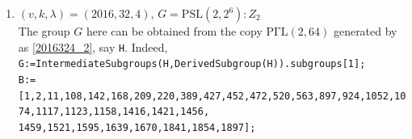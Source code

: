 \documentclass[a4paper,twopage,reqno,12pt]{amsart}
\theoremstyle{definition}
\numberwithin{equation}{section}
\newcommand{\PSL}{\mathrm{PSL}}
\newcommand{\PGaL}{\mathrm{P\Gamma L}}
\newcommand{\Aut}{\mathrm{Aut}}
\begin{document}
\begin{enumerate}
{{(283,290,315,431,304)(286,391,341,360,444)(287,416,359,336,394)(288,313,392,451,486)(289,378,342,429,485)\\
(291,417,476,338,307)(293,421,302,401,492)(294,321,410,472,491)(296,322,412,367,435)(297,397,344,371,448)\\
(298,396,478,350,442)(299,398,351,319,389)(301,355,379,361,349)(305,402,317,380,440)(311,333,408,496,474)\\
(312,430,467,326,404)(314,357,445,386,323)(318,362,447,454,488)(320,411,337,385,438)(324,413,390,325,403)\\
(328,405,343,393,452)(329,407,493,464,372)(330,406,459,470,462)(332,339,424,471,490)(335,423,455,482,387)\\
(345,432,487,374,450)(353,443,494,461,475)(354,358,377,453,366)(363,446,369,436,484)(364,383,441,457,483)\\
(388,439,473,456,463);\\}
}
\texttt{B:=[1,2,3,7,29,73,121,170,175,177,187,223,237,259,267,284,308,311,315,\\422,427,486];}\\



\item\label{2016324_1} $(v,k,\lambda)=(2016,32,4)$, $G=\PSL(2,2^6):Z_{2}$\\
    The group $G$ here can be obtained from the copy $\PGaL(2,64)$ generated by as \ref{2016324_2}, say \texttt{H}. Indeed,\\ \texttt{G:=IntermediateSubgroups(H,DerivedSubgroup(H)).subgroups[1];} \\ 
     {\tiny    
\texttt{B:=[1,2,11,108,142,168,209,220,389,427,452,472,520,563,897,924,1052,1074,1117,1123,1158,1416,1421,1456,\\1459,1521,1595,1639,1670,1841,1854,1897];}}\\
 

\end{enumerate}
\end{document}
